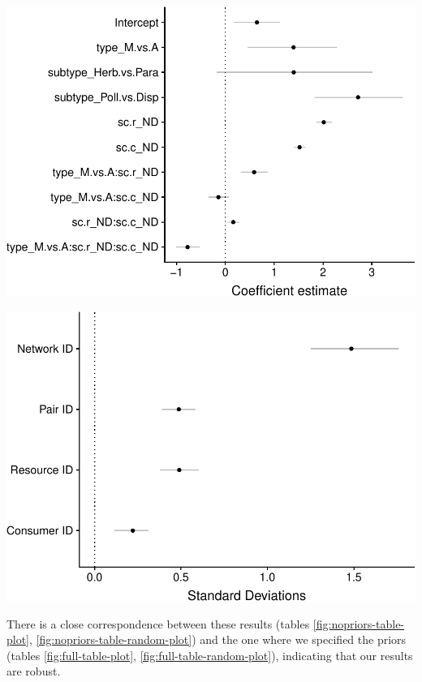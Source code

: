 \documentclass[11pt,]{article}
\let\origfigure\figure
\let\endorigfigure\endfigure
\renewenvironment{figure}[1][2] {
    \expandafter\origfigure\expandafter[H]
} {
    \endorigfigure
}
\begin{document}
\begin{figure}

{\centering \includegraphics[width=0.75\linewidth]{reproduce_analyses_files/figure-latex/nopriors-table-plot-1} 

}

\caption{Mean and 95\% credible intervals of fixed effects from our full model.}\label{fig:nopriors-table-plot}
\end{figure}

\begin{figure}

{\centering \includegraphics[width=0.75\linewidth]{reproduce_analyses_files/figure-latex/nopriors-table-random-plot-1} 

}

\caption{Mean and 95\% credible intervals of random effects from the no priors model.}\label{fig:nopriors-table-random-plot}
\end{figure}

There is a close correspondence between these results (tables
\ref{fig:nopriors-table-plot}, \ref{fig:nopriors-table-random-plot}) and
the one where we specified the priors (tables \ref{fig:full-table-plot},
\ref{fig:full-table-random-plot}), indicating that our results are
robust.


\end{document}
